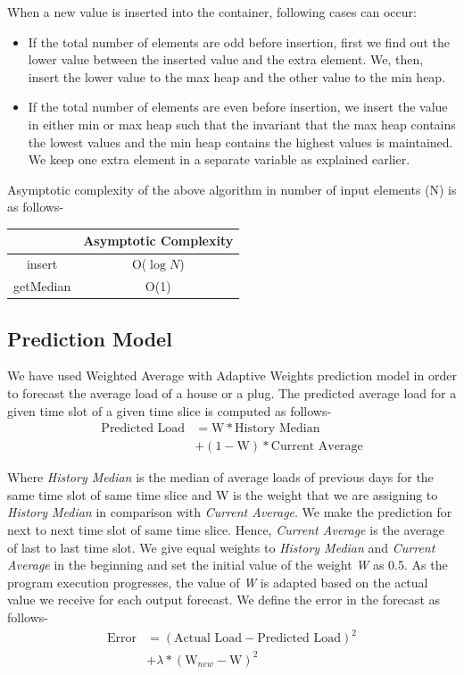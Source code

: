 \noindent When a new value is inserted into the container, following cases can occur:
\begin{itemize}
\item If the total number of elements are odd before insertion, first we find out the lower value between the inserted value and the extra element.
We, then, insert the lower value to the max heap and the other value to the min heap.
\item If the total number of elements are even before insertion, we insert the value in either min or max heap such that the invariant that the max heap contains the lowest values and the min heap contains the highest values is maintained.
We keep one extra element in a separate variable as explained earlier.
\end{itemize}

\noindent Asymptotic complexity of the above algorithm in number of input elements (N) is as follows-

\begin{table}[h]
\begin{center}
\begin{tabular}{|c|c|}
\hline 
& Asymptotic Complexity \\ 
\hline 
insert & O($\log N$) \\ 
\hline 
getMedian & O(1) \\ 
\hline 
\end{tabular}
\end{center}
\end{table}

\vspace*{-0.5cm}
\subsection{Prediction Model}
We have used Weighted Average with Adaptive Weights prediction model in order to forecast the average load of a house or a plug.
The predicted average load for a given time slot of a given time slice is computed as follows-
\begin{align*}
\mbox{Predicted Load} &= \mbox{W}*\mbox{History Median} \\ &+ (1-\mbox{W})*\mbox{Current Average}
\end{align*}

\noindent Where \textit{History Median} is the median of average loads of previous days for the same time slot of same time slice and W is the weight that we are assigning to \textit{History Median} in comparison with \textit{Current Average}.
We make the prediction for next to next time slot of same time slice.
Hence, \textit{Current Average} is the average of last to last time slot.
We give equal weights to \textit{History Median} and \textit{Current Average} in the beginning and set the initial value of the weight \textit{W} as 0.5.
As the program execution progresses, the value of \textit{W} is adapted based on the actual value we receive for each output forecast.
We define the error in the forecast as follows-
\begin{align*}
\mbox{Error} &= (\mbox{Actual Load} - \mbox{Predicted Load})^2\\ &+ \lambda * (\mbox{W}_{new} - \mbox{W})^2
\end{align*}

